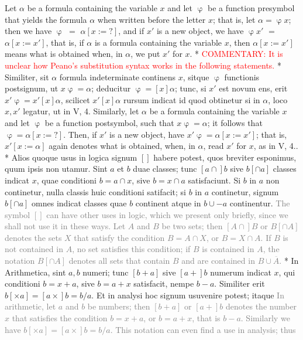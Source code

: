 \documentclass{book}
\newcommand\irrelavent[1]{\textcolor{gray}{#1}}
\newcommand\commentary[1]{\textcolor{red}{COMMENTARY: #1}}
\newenvironment{translateTwoCol}
               { %
                 \columnratio{0.5, 0.5} \begin{paracol}{2}
                 \newcommand{\LAT}{\switchcolumn[0]*}
                 \newcommand{\ENG}{\switchcolumn[1]}
               }
               { %
                 \let\ENG\undefined
                 \let\LAT\undefined
                 \end{paracol}
               }
\begin{document}
\begin{translateTwoCol}
\ENG
Let $\alpha$ be a formula containing the variable $x$ and let $\upvarphi$ be a function presymbol that yields the formula $\alpha$ when written before the letter $x$; that is, let $\alpha = \upvarphi x$; then we have $\upvarphi$ $=$ $\alpha [x := ? ]$, and if $x'$ is a new object, we have $\upvarphi x'$ $=$ $\alpha [x := x']$, that is, if $\alpha$ is a formula containing the variable $x$, then $\alpha[x := x']$ means what is obtained when, in $\alpha$, we put $x'$ for $x$.
\LAT
\ENG
\commentary{It is unclear how Peano's substitution syntax works in the following statements.} 
\LAT
Similiter, sit $\alpha$ formula indeterminate continens $x$, sitque $\upvarphi$ functionis postsignum, ut $x \upvarphi = \alpha$; deducitur $\upvarphi = [x] \alpha$; tunc, si $x'$ est novum ens, erit $x' \upvarphi = x' [x] \alpha$, scilicet $x' [x] \alpha$ rursum indicat id quod obtinetur si in $\alpha$, loco $x, x'$ legatur, ut in V, 4.
\ENG
Similarly, let $\alpha$ be a formula containing the variable $x$ and let $\upvarphi$ be a function postsymbol, such that $x\upvarphi = \alpha$; it follows that $\upvarphi = \alpha[x := ?]$. Then, if $x'$ is a new object, have $x' \upvarphi = \alpha[x := x']$; that is, $x'[x := \alpha]$ again denotes what is obtained, when, in $\alpha$, read $x'$ for $x$, as in V, 4..
\LAT
Alios quoque usus in logica signum $[ ]$ habere potest, quos breviter esponimus, quum ipsis non utamur. Sint $a$ et $b$ duae classes; tunc $[a \cap ]b$ sive $b[ \cap a]$ classes indicat $x$, quae conditioni $b = a \cap x$, sive $b = x \cap a$ satisfaciunt. Si $b$ in $a$ non continetur, nulla classis huic conditioni satifacit; si $b$ in $a$ continetur, signum $b [ \cap a ]$ omnes indicat classes quae $b$ continent atque in $b \cup - a$ continentur.
\ENG
\irrelavent{The symbol $[ ]$ can have other uses in logic, which we present only briefly, since we shall not use it in these ways. Let $A$ and $B$ be two sets; then $[A \cap ]B$ or $B[ \cap A]$ denotes the sets $X$ that satisfy the condition $B = A \cap X$, or $B = X \cap A$. If $B$ is not contained in $A$, no set satisfies this condition; if $B$ is contained in $A$, the notation $B [ \cap A ]$ denotes all sets that contain $B$ and are contained in $B \cup  \overline{A}$.} %
\LAT
In Arithmetica, sint $a, b$ numeri; tunc $[b + a]$ sive $[a +] b$ numerum indicat $x$, qui conditioni $b = x + a$, sive $b = a + x$ satisfacit, nempe $b - a$. Similiter erit $b [ \times a ] = [a \times ] b = b / a$. Et in analysi hoc signum usuvenire potest; itaque
\ENG
\irrelavent{In arithmetic, let $a$ and $b$ be numbers; then $[b + a]$ or $[a +] b$ denotes the number $x$ that satisfies the condition $b = x + a$, or $b = a + x$, that is $b - a$. Similarly we have $b [ \times a ] = [a \times ] b = b / a$. This notation can even find a use in analysis; thus} %
\end{translateTwoCol}
\end{document}
